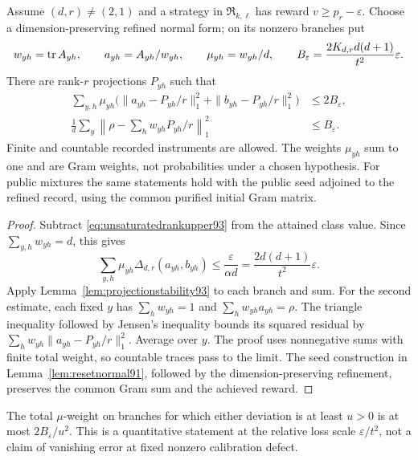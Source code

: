 \begin{corollary}
\label{cor:nearoptimalframes93}
Assume $(d,r)\ne(2,1)$ and a strategy in
$\mathfrak R_{k,\ell}$ has reward $v\ge p_r-\varepsilon$.
Choose a dimension-preserving refined normal form; on its nonzero
branches put
\[
 w_{yh}=\operatorname{tr} A_{yh},\qquad a_{yh}=A_{yh}/w_{yh},\qquad
 \mu_{yh}=w_{yh}/d,\qquad
 B_\varepsilon=\frac{2K_{d,r}d(d+1)}{t^2}\varepsilon.
\]
There are rank-$r$ projections $P_{yh}$ such that
\begin{align}
 \sum_{y,h}\mu_{yh}
  \bigl(\|a_{yh}-P_{yh}/r\|_1^2+
              \|b_{yh}-P_{yh}/r\|_1^2\bigr)&\le2B_\varepsilon,
 \label{eq:nearoptimalframes93}\\
 \frac1d\sum_y\left\|\rho-\sum_hw_{yh}P_{yh}/r\right\|_1^2
          &\le B_\varepsilon.
 \label{eq:framebarycenter93}
\end{align}
Finite and countable recorded instruments are allowed.  The weights
$\mu_{yh}$ sum to one and are Gram weights, not probabilities under a
chosen hypothesis.  For public mixtures the same statements hold with
the public seed adjoined to the refined record, using the common
purified initial Gram matrix.
\end{corollary}
\begin{proof}
Subtract \eqref{eq:unsaturatedrankupper93} from the attained class
value.  Since $\sum_{y,h}w_{yh}=d$, this gives
\[
 \sum_{y,h}\mu_{yh}\Delta_{d,r}(a_{yh},b_{yh})
       \le\frac{\varepsilon}{\alpha d}
       =\frac{2d(d+1)}{t^2}\varepsilon.
\]
Apply Lemma~\ref{lem:projectionstability93} to each branch and sum.
For the second estimate, each fixed $y$ has $\sum_hw_{yh}=1$ and
$\sum_hw_{yh}a_{yh}=\rho$.  The triangle inequality followed by
Jensen's inequality bounds its squared residual by
$\sum_hw_{yh}\|a_{yh}-P_{yh}/r\|_1^2$.
Average over $y$.  The proof uses nonnegative sums with finite total
weight, so countable traces pass to the limit.  The seed construction
in Lemma~\ref{lem:resetnormal91}, followed by the dimension-preserving
refinement, preserves the common Gram sum and the achieved reward.
\end{proof}
The total $\mu$-weight on branches for which either deviation is at
least $u>0$ is at most $2B_\varepsilon/u^2$.  This is a quantitative
statement at the relative loss scale $\varepsilon/t^2$, not a claim
of vanishing error at fixed nonzero calibration defect.


